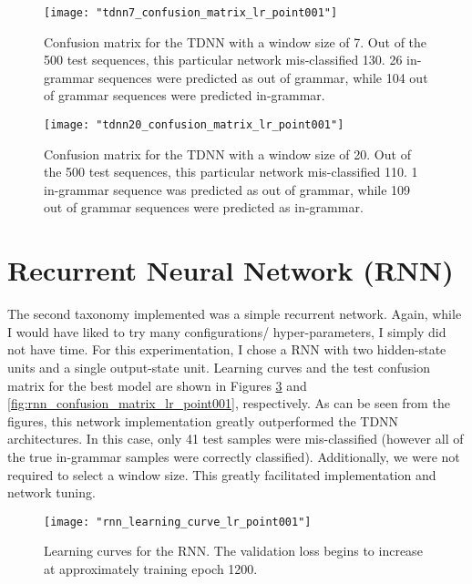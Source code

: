 \documentclass{article}[12 pt]
\begin{document}
\begin{center}
	\begin{figure}[H]
		\centering
		\texttt{[image: "tdnn7\_confusion\_matrix\_lr\_point001"]}
		\caption{Confusion matrix for the TDNN with a window size of 7.  Out of the 500 test sequences, this particular network mis-classified 130.  26 in-grammar sequences were predicted as out of grammar, while 104 out of grammar sequences were predicted in-grammar.}
		\label{fig:tdnn7_confusion_matrix_lr_point001}
	\end{figure}
\end{center}

\begin{center}
	\begin{figure}[H]
		\centering
		\texttt{[image: "tdnn20\_confusion\_matrix\_lr\_point001"]}
		\caption{Confusion matrix for the TDNN with a window size of 20.  Out of the 500 test sequences, this particular network mis-classified 110.  1 in-grammar sequence was predicted as out of grammar, while 109 out of grammar sequences were predicted as in-grammar.}
		\label{fig:tdnn20_confusion_matrix_lr_point001}
	\end{figure}
\end{center}


\section*{Recurrent Neural Network (RNN)}

The second taxonomy implemented was a simple recurrent network.  Again, while I would have liked to try many configurations/ hyper-parameters, I simply did not have time.  For this experimentation, I chose a RNN with two hidden-state units and a single output-state unit.  Learning curves and the test confusion matrix for the best model are shown in Figures \ref{fig:rnn_learning_curve_lr_point001} and \ref{fig:rnn_confusion_matrix_lr_point001}, respectively.  As can be seen from the figures, this network implementation greatly outperformed the TDNN architectures.  In this case, only 41 test samples were mis-classified (however all of the true in-grammar samples were correctly classified).  Additionally, we were not required to select a window size.  This greatly facilitated implementation and network tuning.

\begin{center}
	\begin{figure}[H]
		\centering
		\texttt{[image: "rnn\_learning\_curve\_lr\_point001"]}
		\caption{Learning curves for the RNN.  The validation loss begins to increase at approximately training epoch 1200.}
		\label{fig:rnn_learning_curve_lr_point001}
	\end{figure}
\end{center}
\end{document}
